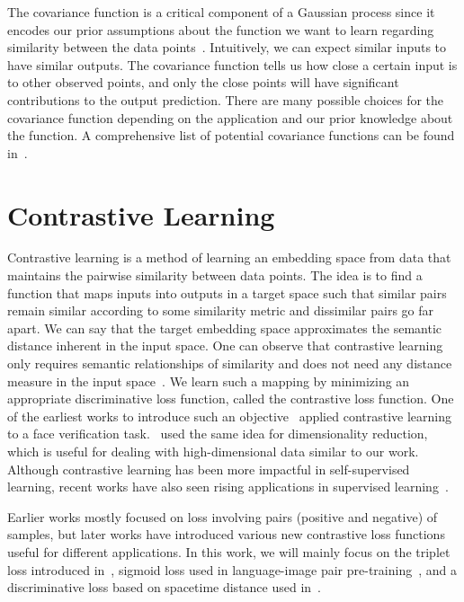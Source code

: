 The covariance function is a critical component of a Gaussian process since it encodes our prior assumptions about the function we want to learn regarding similarity between the data points~\cite{GPML}. Intuitively, we can expect similar inputs to have similar outputs. The covariance function tells us how close a certain input is to other observed points, and only the close points will have significant contributions to the output prediction. There are many possible choices for the covariance function depending on the application and our prior knowledge about the function. A comprehensive list of potential covariance functions can be found in~\cite{GPML}.


\section{Contrastive Learning}\label{Contrast}
Contrastive learning is a method of learning an embedding space from data that maintains the pairwise similarity between data points. The idea is to find a function that maps inputs into outputs in a target space such that similar pairs remain similar according to some similarity metric and dissimilar pairs go far apart. We can say that the target embedding space approximates the semantic distance inherent in the input space. One can observe that contrastive learning only requires semantic relationships of similarity and does not need any distance measure in the input space~\cite{PairMarginCL}. We learn such a mapping by minimizing an appropriate discriminative loss function, called the contrastive loss function. One of the earliest works to introduce such an objective~\cite{ContLoss} applied contrastive learning to a face verification task.~\cite{PairMarginCL} used the same idea for dimensionality reduction, which is useful for dealing with high-dimensional data similar to our work. Although contrastive learning has been more impactful in self-supervised learning, recent works have also seen rising applications in supervised learning~\cite{SelfSupervisedCont, SupervisedCont}.
\newline

Earlier works mostly focused on loss involving pairs (positive and negative) of samples, but later works have introduced various new contrastive loss functions useful for different applications. In this work, we will mainly focus on the triplet loss introduced in~\cite{TripletLoss}, sigmoid loss used in language-image pair pre-training~\cite{SigLIP}, and a discriminative loss based on spacetime distance used in~\cite{SpaceMesh}.
\newline


